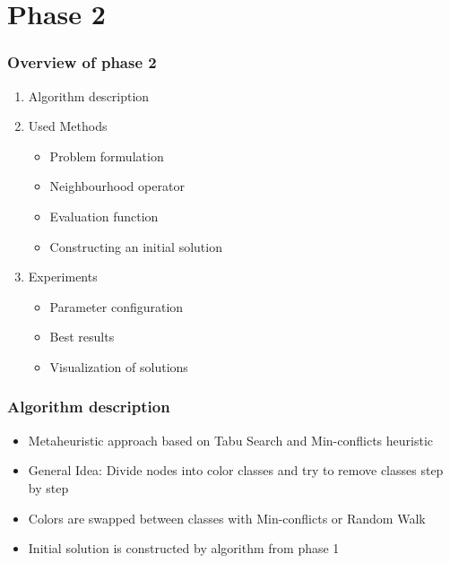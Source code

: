 \documentclass{beamer}
\begin{document}
\section{Phase 2}
  \begin{frame}
    \frametitle{Overview of phase 2}
    \begin{enumerate}

        \item Algorithm description
        \item Used Methods
          \begin{itemize}
            \item Problem formulation
            \item Neighbourhood operator
            \item Evaluation function
            \item Constructing an initial solution
          \end{itemize}
        \item Experiments
          \begin{itemize}
          \item Parameter configuration
          \item Best results
          \item Visualization of solutions
          \end{itemize}


    \end{enumerate}
  \end{frame}


\begin{frame}
    \frametitle{Algorithm description}

    \begin{itemize}
    \item Metaheuristic approach based on Tabu Search and Min-conflicts heuristic
    \item General Idea: Divide nodes into color classes and try to remove classes step by step
    \item Colors are swapped between classes with Min-conflicts or Random Walk
    \item Initial solution is constructed by algorithm from phase 1
    \end{itemize}

  \end{frame}
\end{document}
